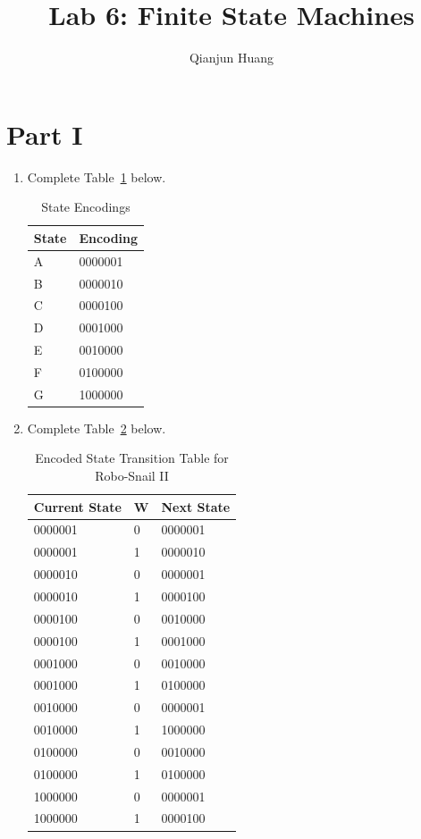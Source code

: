 \documentclass{article}
\title{Lab 6: Finite State Machines}
\author{Qianjun Huang}
\begin{document}
\maketitle

\section{Part I}

\begin{enumerate}

\item Complete Table~\ref{t:part1_state_encodings} below.

\begin{table}[ht!]
\caption{State Encodings}
\label{t:part1_state_encodings}
\centering
\begin{tabular}{|l|l|}
\hline
State & Encoding \\ \hline
A & 0000001\\ \hline
B & 0000010\\ \hline
C & 0000100\\ \hline
D & 0001000\\ \hline
E & 0010000\\ \hline
F & 0100000\\ \hline
G & 1000000\\ \hline
\end{tabular}
\end{table}

\item Complete Table~\ref{t:part1_encoded_transition_table} below.

\begin{table}[ht!]
\caption{Encoded State Transition Table for Robo-Snail II}
\label{t:part1_encoded_transition_table}
\centering
\begin{tabular}{|l|l|l|}
\hline
Current State & W & Next State \\ \hline
0000001 & 0 & 0000001\\
0000001 & 1 & 0000010\\
0000010 & 0 & 0000001\\
0000010 & 1 & 0000100\\
0000100 & 0 & 0010000\\
0000100 & 1 & 0001000\\
0001000 & 0 & 0010000\\
0001000 & 1 & 0100000\\
0010000 & 0 & 0000001\\
0010000 & 1 & 1000000\\ 
0100000 & 0 & 0010000\\
0100000 & 1 & 0100000\\
1000000 & 0 & 0000001\\
1000000 & 1 & 0000100\\
\hline
\end{tabular}
\end{table}


\end{enumerate}
\end{document}

